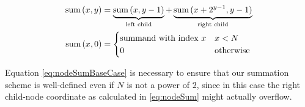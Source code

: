 \begin{align}
\textrm{sum}\, (x, y) &= \underbrace{\textrm{sum}\, (x, y - 1)}_{\textrm{left child}}
+ \underbrace{\textrm{sum}\, (x + 2^{y - 1}, y - 1)}_{\textrm{right child}} \label{eq:nodeSum} \\
\textrm{sum}\, (x, 0) &= \begin{cases}
\textrm{summand with index $x$} & x < N \\
0 & \textrm{otherwise}
\end{cases}
\label{eq:nodeSumBaseCase}
\end{align}

Equation \eqref{eq:nodeSumBaseCase} is necessary to ensure that our summation scheme is well-defined even if $N$ is not a power of $2$,
since in this case the right child-node coordinate as calculated in \eqref{eq:nodeSum} might actually overflow.

